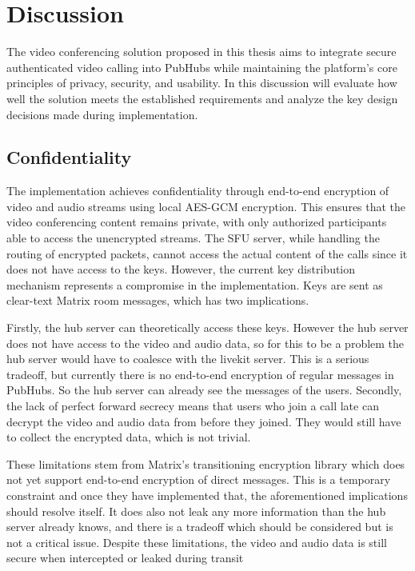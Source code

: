 \documentclass{report}
\begin{document}
\chapter{Discussion}
The video conferencing solution proposed in this thesis aims to integrate secure authenticated video calling into
PubHubs while maintaining the platform's core principles of privacy, security, and usability. In this discussion will
evaluate how well the solution meets the established requirements and analyze the key design decisions made during
implementation.

\section{Confidentiality}
The implementation achieves confidentiality through end-to-end encryption of video and audio streams using local
AES-GCM encryption. This ensures that the video conferencing content remains private, with only authorized
participants able to access the unencrypted streams. The SFU server, while handling the routing of encrypted
packets, cannot access the actual content of the calls since it does not have access to the keys. However, the current
key distribution mechanism represents a compromise in the implementation. Keys are sent as
clear-text Matrix room messages, which has two implications.

Firstly, the hub server can theoretically access these
keys. However the hub server does not have access to the video and audio data, so for this to be a problem the hub
server would have to coalesce with the livekit server. This is a serious tradeoff, but currently there is no end-to-end
encryption of regular messages in PubHubs. So the hub server can already see the messages of the users. Secondly,
the lack of perfect forward secrecy means that users who join a call late can decrypt the video and audio data from
before they joined. They would still have to collect the encrypted data, which is not trivial.

These limitations stem from Matrix's transitioning encryption library which does not yet support end-to-end
encryption of direct messages. This is a temporary constraint and once they have implemented that, the
aforementioned implications should resolve itself. It does also not leak any more information than the hub server
already knows, and there is a tradeoff which should be considered but is not a critical issue. Despite these limitations,
the video and audio data is still secure when intercepted or leaked during transit
\end{document}
